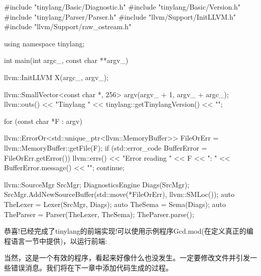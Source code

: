 \begin{cpp}
#include "tinylang/Basic/Diagnostic.h"
#include "tinylang/Basic/Version.h"
#include "tinylang/Parser/Parser.h"
#include "llvm/Support/InitLLVM.h"
#include "llvm/Support/raw_ostream.h"

using namespace tinylang;

int main(int argc_, const char **argv_) {
    llvm::InitLLVM X(argc_, argv_);

    llvm::SmallVector<const char *, 256> argv(argv_ + 1,
                                              argv_ + argc_);
    llvm::outs() << "Tinylang "
                 << tinylang::getTinylangVersion() << "\n";

    for (const char *F : argv) {
        llvm::ErrorOr<std::unique_ptr<llvm::MemoryBuffer>>
            FileOrErr = llvm::MemoryBuffer::getFile(F);
        if (std::error_code BufferError =
                FileOrErr.getError()) {
            llvm::errs() << "Error reading " << F << ": "
                         << BufferError.message() << "\n";
            continue;
        }

        llvm::SourceMgr SrcMgr;
        DiagnosticsEngine Diags(SrcMgr);
        SrcMgr.AddNewSourceBuffer(std::move(*FileOrErr),
                                  llvm::SMLoc());
        auto TheLexer = Lexer(SrcMgr, Diags);
        auto TheSema = Sema(Diags);
        auto TheParser = Parser(TheLexer, TheSema);
        TheParser.parse();
    }
}
\end{cpp}

恭喜!已经完成了tinylang的前端实现!可以使用示例程序Gcd.mod(在定义真正的编程语言一节中提供)，以运行前端:


当然，这是一个有效的程序，看起来好像什么也没发生。一定要修改文件并引发一些错误消息。我们将在下一章中添加代码生成的过程。





